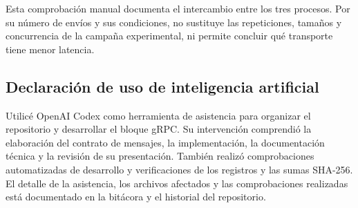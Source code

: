 Esta comprobación manual documenta el intercambio entre los tres
procesos. Por su número de envíos y sus condiciones, no sustituye
las repeticiones, tamaños y concurrencia de la campaña experimental,
ni permite concluir qué transporte tiene menor latencia.

\subsection{Declaración de uso de inteligencia artificial}

Utilicé OpenAI Codex como herramienta de asistencia para organizar el
repositorio y desarrollar el bloque gRPC. Su intervención comprendió la
elaboración del contrato de mensajes, la implementación, la documentación
técnica y la revisión de su presentación. También realizó comprobaciones
automatizadas de desarrollo y verificaciones de los registros y las sumas
SHA-256. El detalle de la asistencia, los archivos afectados y las
comprobaciones realizadas está documentado en la bitácora y el historial
del repositorio.
